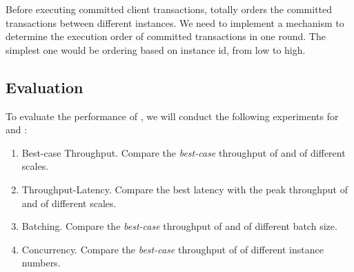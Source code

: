 \par Before executing committed client transactions, \RCC{} totally orders the committed transactions between 
different instances.  We need to implement a mechanism to determine the execution order of committed transactions 
in one round. The simplest one would be ordering based on instance id, from low to high.

\subsection{Evaluation}

\par To evaluate the performance of \RCC{}, we will conduct the following experiments for \RCC{} and \PBFT{}:

\begin{enumerate}
    \item Best-case Throughput. Compare the \emph{best-case} throughput of \RCC{} and \PBFT{} of different scales.
    \item Throughput-Latency. Compare the best latency with the peak throughput of \RCC{} and \PBFT{} of different scales.
    \item Batching. Compare the \emph{best-case} throughput of \RCC{} and \PBFT{} of different batch size.
    \item Concurrency. Compare the \emph{best-case} throughput of \RCC{} of different instance numbers.
\end{enumerate}